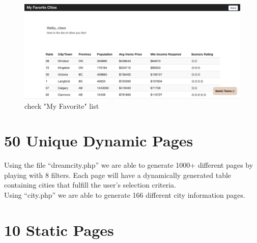 \documentclass[12pt, letterpaper]{article}
\begin{document}
 \begin{figure}[htbp]
	\centering
	\includegraphics[width=5in]{images/q5_4.png}
	\caption{check "My Favorite" list}
 \end{figure}
 \newpage


\section{50 Unique Dynamic Pages}
Using the file “dreamcity.php” we are able to generate 1000+ different pages by playing with 8 filters. Each page will have a dynamically generated table containing cities that fulfill the user’s selection criteria.
\\Using “city.php” we are able to generate 166 different city information pages.

\section{10 Static Pages}
\end{document}
